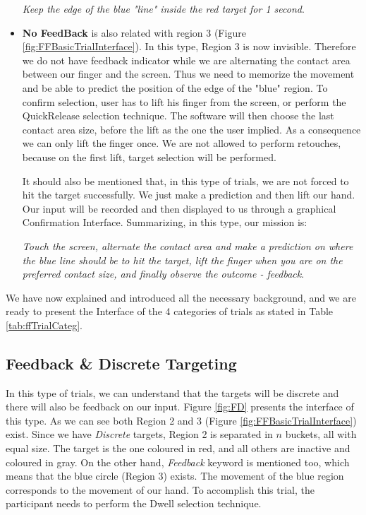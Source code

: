 \begin{itemize}
	\emph{Keep the edge of the blue "line" inside the red target for 1 second}.

	\item \textbf{No FeedBack} is also related with region 3 (Figure \ref{fig:FFBasicTrialInterface}). In this type, Region 3 is now invisible. Therefore we do not have feedback indicator while we are alternating the contact area between our finger and the screen. Thus we need to memorize the movement and be able to predict the position of the edge of the "blue" region. To confirm selection, user has to lift his finger from the screen, or perform the QuickRelease selection technique. The software will then choose the last contact area size,  before the lift as the one the user implied. As a consequence we can only lift the finger once. We are not allowed to perform retouches, because on the first lift, target selection will be performed. 

	It should also be mentioned that, in this type of trials, we are not forced to hit the target successfully. We just make a prediction and then lift our hand. Our input will be recorded and then displayed to us through a graphical Confirmation Interface.  Summarizing, in this type, our mission is:

	\emph{Touch the screen, alternate the contact area and make a prediction on where the blue line should be to hit the target, lift the finger when you are on the preferred contact size, and finally observe the outcome - feedback}.
\end{itemize}

We have now explained and introduced all the necessary background, and we are ready to present the Interface of the 4 categories of trials as stated in Table \ref{tab:ffTrialCateg}.


\subsection{Feedback \& Discrete Targeting}


In this type of trials, we can understand that the targets will be discrete and there will also be feedback on our input. Figure \ref{fig:FD} presents the interface of this type. As we can see both Region 2 and 3 (Figure \ref{fig:FFBasicTrialInterface}) exist. Since we have \emph{Discrete} targets, Region 2 is separated in $n$ buckets, all with equal size. The target is the one coloured in red, and all others are inactive and coloured in gray. On the other hand, \emph{Feedback} keyword is mentioned too, which means that the blue circle (Region 3) exists. The movement of the blue region corresponds to the movement of our hand. To accomplish this trial, the participant needs to perform the Dwell selection technique.

